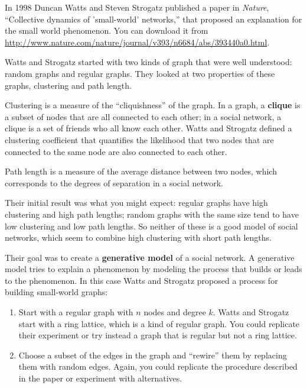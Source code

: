 \documentclass[10pt]{book}
\begin{document}
In 1998 Duncan Watts and Steven Strogatz published a paper in {\em
  Nature}, ``Collective dynamics of 'small-world' networks,'' that
proposed an explanation for the small world phenomenon.  You can
download it from
\url{http://www.nature.com/nature/journal/v393/n6684/abs/393440a0.html}.
  

Watts and Strogatz started with two kinds of graph that were well
understood: random graphs and regular graphs.  They looked at two
properties of these graphs, clustering and path length.

\begin{description}

\item Clustering is a measure of the ``cliquishness'' of the graph.
In a graph, a {\bf clique} is a subset of nodes that are
all connected to each other; in a social network, a clique is
a set of friends who all know each other.  Watts and Strogatz
defined a clustering coefficient that quantifies the likelihood
that two nodes that are connected to the same node are also
connected to each other.

\item Path length is a measure of the average distance between
two nodes, which corresponds to the degrees of separation in
a social network.

\end{description}

Their initial result was what you might expect: regular graphs
have high clustering and high path lengths;
random graphs with the same size tend to have low clustering
and low path lengths.  So neither of these is a good model of
social networks, which seem to combine high clustering with
short path lengths.

Their goal was to create a {\bf generative model} of a social
network.  A generative model tries to explain a phenomenon by
modeling the process that builds or leads to the phenomenon.  In
this case Watts and Strogatz proposed a process for building
small-world graphs:

\begin{enumerate}

\item Start with a regular graph with $n$ nodes and degree $k$.  
  Watts and Strogatz start with a ring lattice, which is
  a kind of regular graph.  You could replicate their experiment or
  try instead a graph that is regular but not a ring lattice.

\item Choose a subset of the edges in the graph and ``rewire'' them by
  replacing them with random edges.  Again, you could replicate the
  procedure described in the paper or experiment with alternatives.

\end{enumerate}
\end{document}
